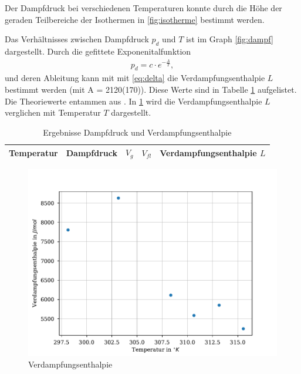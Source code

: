\documentclass[11pt, a4paper]{article}
\begin{document}
    Der Dampfdruck bei verschiedenen Temperaturen konnte durch die Höhe der geraden Teilbereiche
    der Isothermen in \ref{fig:isotherme} bestimmt werden.
    

   Das Verhältnisses zwischen Dampfdruck $p_d$ und $T$ ist im Graph \ref{fig:dampf} dargestellt.
   Durch die gefittete Exponenitalfunktion
    \begin{align}
        p_d = c \cdot e^{-\frac{A}{T}},
    \end{align}
    und deren Ableitung kann mit mit \ref{eq:delta}
    die Verdampfungsenthalpie $L$ bestimmt werden (mit A = 2120(170)). Diese Werte sind in Tabelle \ref{tab:dampfmess}
    aufgelistet. Die Theoriewerte entammen aus \cite{SH6}. In \ref{fig:verd} wird die Verdampfungsenthalpie $L$ verglichen mit Temperatur $T$ dargestellt.
    \begin{table}
        \begin{adjustwidth}{-.5in}{-.5in}
        \centering
        \begin{tabular}{c c c c c}
            Temperatur & Dampfdruck & $V_g$ & $V_{fl}$ & Verdampfungsenthalpie $L$ \\ \hline
            
            
        \end{tabular}
        
        \caption{Ergebnisse Dampfdruck und Verdampfungsenthalpie}\label{tab:dampfmess}
        \end{adjustwidth}
    \end{table}
    \begin{figure}
        \centering
        \includegraphics[width=\textwidth]{./Plots/verd.pdf}

        \caption{Verdampfungsenthalpie}
        \label{fig:verd}
    \end{figure}
\end{document}
